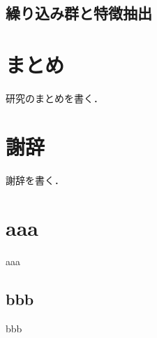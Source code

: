 \documentclass[a4paper,11pt]{jsreport}
\begin{document}
\section{繰り込み群と特徴抽出}


\chapter{まとめ}
研究のまとめを書く．

\chapter*{謝辞} %
謝辞を書く．


\renewcommand{\bibname}{参考文献} %

\appendix
\renewcommand{\thechapter}{\Alph{chapter}}
\renewcommand{\thesection}{\Alph{chapter}.\arabic{section}}
\setcounter{section}{0}
\renewcommand{\theequation}{\Alph{chapter}.\arabic{equation}}
\setcounter{equation}{0}

\chapter{aaa}
aaa
\section{bbb}
bbb
\end{document}
